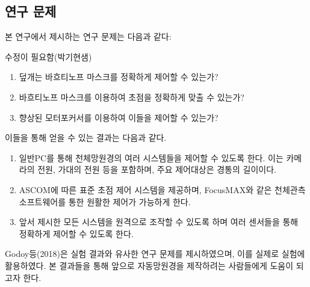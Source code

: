 \subsection{연구 문제}

본 연구에서 제시하는 연구 문제는 다음과 같다:

수정이 필요함(박기현샘)
\begin{enumerate}
	
	\item 덮개는 바흐티노프 마스크를 정확하게 제어할 수 있는가?
	\item 바흐티노프 마스크를 이용하여 초점을 정확하게 맞출 수 있는가?
	\item 향상된 모터포커서를 이용하여 이들을 제어할 수 있는가?
	
\end{enumerate}
이들을 통해 얻을 수 있는 결과는 다음과 같다.

\begin{enumerate}
	
	\item 일반PC를 통해 천체망원경의 여러 시스템들을 제어할 수 있도록 한다. 이는 카메라의 전원, 가대의 전원 등을 포함하며, 주요 제어대상은 경통의 길이이다.
	\item ASCOM에 따른 표준 초점 제어 시스템을 제공하며, FocusMAX와 같은 천체관측 소프트웨어를 통한 원활한 제어가 가능하게 한다.
	\item 앞서 제시한 모든 시스템을 원격으로 조작할 수 있도록 하며 여러 센서들을 통해 정확하게 제어할 수 있도록 한다.
\end{enumerate}	

Godoy등(2018)은 실험 결과와 유사한 연구 문제를 제시하였으며\cite{godoy2018control}, 이를 실제로 실험에 활용하였다. 본 결과들을 통해 앞으로 자동망원경을 제작하려는 사람들에게 도움이 되고자 한다.